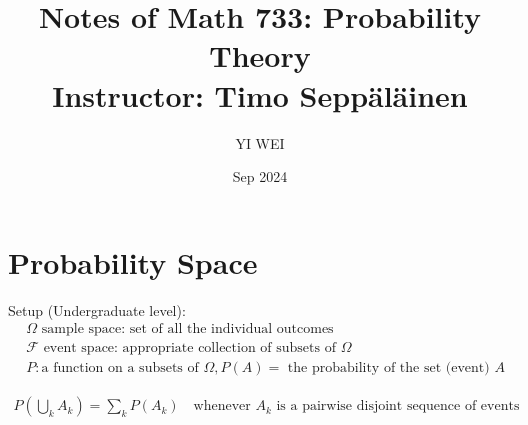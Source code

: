 \documentclass[11pt]{article}
\title{Notes of Math 733: Probability Theory\\ Instructor: Timo Seppäläinen}
\author{YI WEI}
\date{Sep 2024}
\begin{document}
\maketitle
\tableofcontents



\section{Probability Space}

Setup (Undergraduate level):
\begin{align*}
    &\Omega \text{ sample space: set of all the individual outcomes} \\
    &\mathcal{F}\text{ event space: appropriate collection of subsets of } \Omega\\
    &P: \text{a function on a subsets of } \Omega, P(A)= \text{ the probability of the set (event) }A 
\end{align*}

\begin{axiom}
    \begin{align*}
        P(\bigcup_k A_k) = \sum_{k} P(A_k) \quad \text{whenever } {A_k} \text{ is a pairwise disjoint sequence of events} 
    \end{align*}
\end{axiom}
\end{document}
